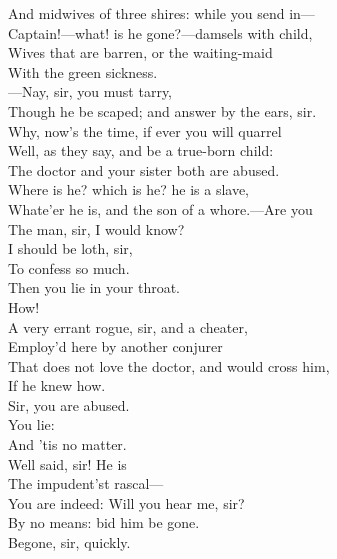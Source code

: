 \documentclass[a4paper,oneside]{memoir}
\begin{document}
\begin{drama*}
And midwives of three shires: while you send in---\\
Captain!---what! is he gone?---damsels with child,\\
Wives that are barren, or the waiting-maid\\
With the green sickness.\\
---Nay, sir, you must tarry,\\
Though he be scaped; and answer by the ears, sir.\\
\facespeaks Why, now's the time, if ever you will quarrel\\
Well, as they say, and be a true-born child:\\
The doctor and your sister both are abused.\\
\kastrilspeaks Where is he? which is he? he is a slave,\\
Whate'er he is, and the son of a whore.---Are you\\
The man, sir, I would know?\\
\surlyspeaks {} I should be loth, sir,\\
To confess so much.\\
\kastrilspeaks {} Then you lie in your throat.\\
\surlyspeaks How!\\
\facespeaks {} A very errant rogue, sir, and a cheater,\\
Employ'd here by another conjurer\\
That does not love the doctor, and would cross him,\\
If he knew how.\\
\surlyspeaks {} Sir, you are abused.\\
\kastrilspeaks {} You lie:\\
And 'tis no matter.\\
\facespeaks {} Well said, sir! He is\\
The impudent'st rascal---\\
\surlyspeaks {} You are indeed: Will you hear me, sir?\\
\facespeaks By no means: bid him be gone.\\
\kastrilspeaks {} Begone, sir, quickly.\\

\end{drama*}
\end{document}
